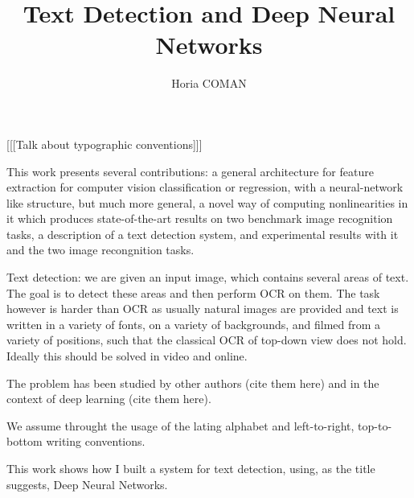\documentclass[12pt,a4paper,oneside,english]{UPBThesis}
\begin{document}
\author{Horia COMAN}

\title{Text Detection and Deep Neural Networks}



\beforepreface
\listoffigures
\listoftables
{}
\afterpreface


[[[Talk about typographic conventions]]]

This work presents several contributions: a general architecture for feature extraction for computer vision classification or regression, with a neural-network like structure, but much more general, a novel way of computing nonlinearities in it which produces state-of-the-art results on two benchmark image recognition tasks, a description of a text detection system, and experimental results with it and the two image recongnition tasks.

Text detection: we are given an input image, which contains several areas of text. The goal is to detect these areas and then perform OCR on them. The task however is harder than OCR as usually natural images are provided and text is written in a variety of fonts, on a variety of backgrounds, and filmed from a variety of positions, such that the classical OCR of top-down view does not hold. Ideally this should be solved in video and online.

The problem has been studied by other authors (cite them here) and in the context of deep learning (cite them here).

We assume throught the usage of the lating alphabet and left-to-right, top-to-bottom writing conventions.

This work shows how I built a system for text detection, using, as the title suggests, Deep Neural Networks.
\end{document}
